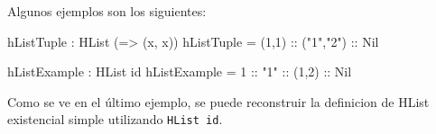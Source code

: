 Algunos ejemplos son los siguientes:

\begin{code}
hListTuple : HList (\x => (x, x))
hListTuple = (1,1) :: ("1","2") :: Nil

hListExample : HList id
hListExample = 1 :: "1" :: (1,2) :: Nil
\end{code}

Como se ve en el último ejemplo, se puede reconstruir la definicion de HList existencial simple utilizando \texttt{HList id}.

